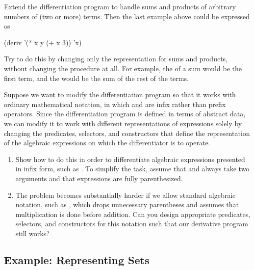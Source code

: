 \begin{exercise}
	\label{Exercise 2.57}
	Extend the differentiation program to handle sums and products of arbitrary numbers of (two or more) terms.
	Then the last example above could be expressed as
	\begin{scheme}
	  (deriv '(* x y (+ x 3)) 'x)
	\end{scheme}
	Try to do this by changing only the representation for sums and products, without changing the  procedure at all.
	For example, the  of a sum would be the first term, and the  would be the sum of the rest of the terms.
\end{exercise}



\begin{exercise}
	\label{Exercise 2.58}
	Suppose we want to modify the differentiation program so that it works with ordinary mathematical notation, in which \code{+} and \code{*} are infix rather than prefix operators.
	Since the differentiation program is defined in terms of abstract data, we can modify it to work with different representations of expressions solely by changing the predicates, selectors, and constructors that define the representation of the algebraic expressions on which the differentiator is to operate.
	\begin{enumerate}[label = \alph*., leftmargin = *]

		\item
			Show how to do this in order to differentiate algebraic expressions presented  in infix form, such as .
			To simplify the task, assume that \code{+} and \code{*} always take two arguments and that expressions are fully parenthesized.

		\item
			The problem becomes substantially harder if we allow standard algebraic notation, such as , which drops unnecessary parentheses and assumes that multiplication is done before addition.
			Can you design appropriate predicates, selectors, and constructors for this notation such that our derivative program still works?

	\end{enumerate}
\end{exercise}



\subsection{Example: Representing Sets}
\label{Section 2.3.3}

